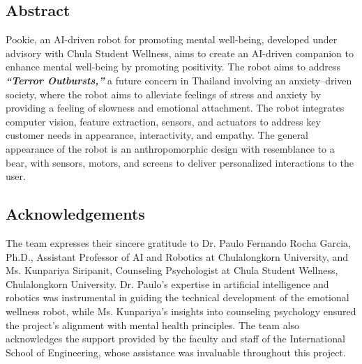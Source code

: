 \documentclass[a4paper,10pt]{article}
\begin{document}
\newpage
\begin{center}
    \item\section*{Abstract}
\end{center}
\large
Pookie, an AI-driven robot for promoting mental well-being, developed under advisory with Chula Student Wellness, aims to create an AI-driven companion to enhance mental well-being by promoting positivity. The robot aims to address \textbf{\textit{“Terror Outbursts,”}} a future concern in Thailand involving an anxiety–driven society, where the robot aims to alleviate feelings of stress and anxiety by providing a feeling of slowness and emotional attachment. The robot integrates computer vision, feature extraction, sensors, and actuators to address key customer needs in appearance, interactivity, and empathy. The general appearance of the robot is an anthropomorphic design with resemblance to a bear, with sensors, motors, and screens to deliver personalized interactions to the user. 
\newpage
\begin{center}
    \item\section*{Acknowledgements}
\end{center}
The team expresses their sincere gratitude to Dr. Paulo Fernando Rocha Garcia, Ph.D., Assistant Professor of AI and Robotics at Chulalongkorn University, and Ms. Kunpariya Siripanit, Counseling Psychologist at Chula Student Wellness, Chulalongkorn University. Dr. Paulo’s expertise in artificial intelligence and robotics was instrumental in guiding the technical development of the emotional wellness robot, while Ms. Kunpariya’s insights into counseling psychology ensured the project’s alignment with mental health principles. The team also acknowledges the support provided by the faculty and staff of the International School of Engineering, whose assistance was invaluable throughout this project. 
\normalsize

\newpage
\tableofcontents

\newpage

\newpage

\newpage

\newpage

\newpage

\newpage

\newpage

\newpage

\newpage


\newpage
{}


\end{document}
